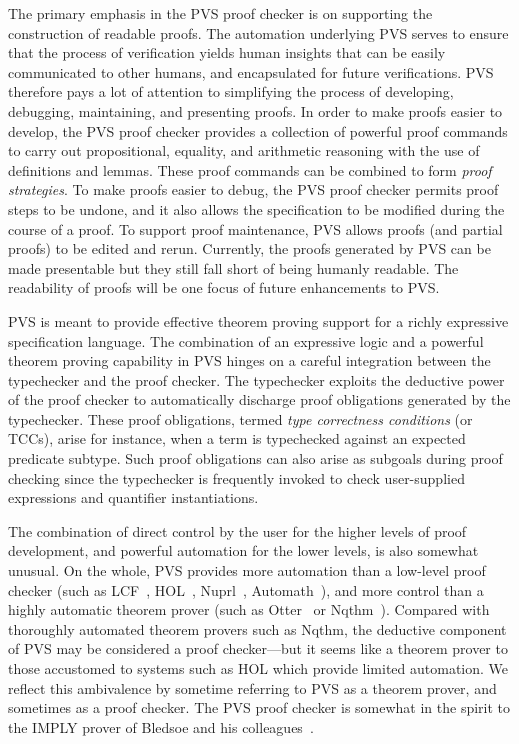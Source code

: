 \documentclass[12pt,twoside]{book}
\begin{document}
The primary emphasis in the PVS proof checker is on supporting the
construction of readable proofs.  The  automation underlying
PVS serves to ensure that the process of verification yields human
insights that can be easily communicated to other humans, and
encapsulated for future verifications.  PVS therefore pays a lot of
attention to simplifying the process of developing, debugging,
maintaining, and presenting proofs.  In order to make proofs easier to
develop, the PVS proof checker provides a collection of powerful proof
commands to carry out propositional, equality, and arithmetic reasoning
with the use of definitions and lemmas.  These proof commands can be
combined to form \emph{proof strategies}.  To make proofs easier to
debug, the PVS proof checker permits proof steps to be undone, and it
also allows the specification to be modified during the course of a
proof.  To support proof maintenance, PVS allows proofs (and partial
proofs) to be edited and rerun.  Currently, the proofs generated by
PVS can be made presentable but they still fall short of being humanly
readable.   The readability of proofs will be one focus of future
enhancements to PVS\@.

PVS is meant to provide effective theorem proving support for a richly
expressive specification language.  The combination of an expressive logic
and a powerful theorem proving capability in PVS hinges on a careful
integration between the typechecker and the proof checker.  The
typechecker exploits the deductive power of the proof checker to
automatically discharge proof obligations generated by the typechecker.
These proof obligations, termed \emph{type correctness conditions} (or
TCCs), arise for instance, when a term is typechecked against
an expected predicate subtype.  Such proof obligations can also arise as
subgoals during proof checking since the typechecker is frequently invoked
to check user-supplied expressions and quantifier instantiations.

The combination of direct control by the user for the higher levels of
proof development, and powerful automation for the lower levels, is also
somewhat unusual.  On the whole, PVS provides more automation than a
low-level proof checker (such as LCF~\cite{LCF},
HOL~\cite{Gordon:HOL88}, Nuprl~\cite{Nuprl-book},
Automath~\cite{deBruijn80}), and more control than a
highly automatic theorem prover (such as Otter~\cite{Otter90}
or Nqthm~\cite{Boyer-Moore79,Boyer-Moore88}).  Compared with
thoroughly automated theorem provers such as Nqthm, the
deductive component of PVS may be considered a proof checker---but it
seems like a theorem prover to those accustomed to systems such as
HOL which provide limited automation.  We reflect this
ambivalence by sometime referring to PVS as a theorem prover, and
sometimes as a proof checker.  The PVS proof checker is somewhat in the
spirit to the IMPLY prover of Bledsoe and his colleagues~\cite{Bledsoe74}.
\end{document}
